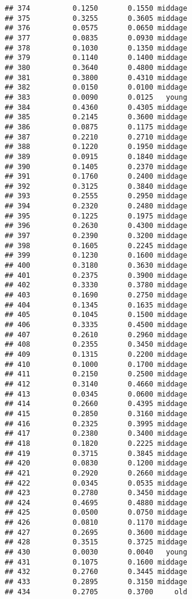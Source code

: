 \documentclass[
]{article}
\begin{document}
\begin{verbatim}
## 374          0.1250       0.1550 middage
## 375          0.3255       0.3605 middage
## 376          0.0575       0.0650 middage
## 377          0.0835       0.0930 middage
## 378          0.1030       0.1350 middage
## 379          0.1140       0.1400 middage
## 380          0.3640       0.4800 middage
## 381          0.3800       0.4310 middage
## 382          0.0150       0.0100 middage
## 383          0.0090       0.0125   young
## 384          0.4360       0.4305 middage
## 385          0.2145       0.3600 middage
## 386          0.0875       0.1175 middage
## 387          0.2210       0.2710 middage
## 388          0.1220       0.1950 middage
## 389          0.0915       0.1840 middage
## 390          0.1405       0.2370 middage
## 391          0.1760       0.2400 middage
## 392          0.3125       0.3840 middage
## 393          0.2555       0.2950 middage
## 394          0.2320       0.2480 middage
## 395          0.1225       0.1975 middage
## 396          0.2630       0.4300 middage
## 397          0.2390       0.3200 middage
## 398          0.1605       0.2245 middage
## 399          0.1230       0.1600 middage
## 400          0.3180       0.3630 middage
## 401          0.2375       0.3900 middage
## 402          0.3330       0.3780 middage
## 403          0.1690       0.2750 middage
## 404          0.1345       0.1635 middage
## 405          0.1045       0.1500 middage
## 406          0.3335       0.4500 middage
## 407          0.2610       0.2960 middage
## 408          0.2355       0.3450 middage
## 409          0.1315       0.2200 middage
## 410          0.1000       0.1700 middage
## 411          0.2150       0.2500 middage
## 412          0.3140       0.4660 middage
## 413          0.0345       0.0600 middage
## 414          0.2660       0.4395 middage
## 415          0.2850       0.3160 middage
## 416          0.2325       0.3995 middage
## 417          0.2380       0.3400 middage
## 418          0.1820       0.2225 middage
## 419          0.3715       0.3845 middage
## 420          0.0830       0.1200 middage
## 421          0.2920       0.2660 middage
## 422          0.0345       0.0535 middage
## 423          0.2780       0.3450 middage
## 424          0.4695       0.4880 middage
## 425          0.0500       0.0750 middage
## 426          0.0810       0.1170 middage
## 427          0.2695       0.3600 middage
## 428          0.3515       0.3725 middage
## 430          0.0030       0.0040   young
## 431          0.1075       0.1600 middage
## 432          0.2760       0.3445 middage
## 433          0.2895       0.3150 middage
## 434          0.2705       0.3700     old

\end{verbatim}
\end{document}
